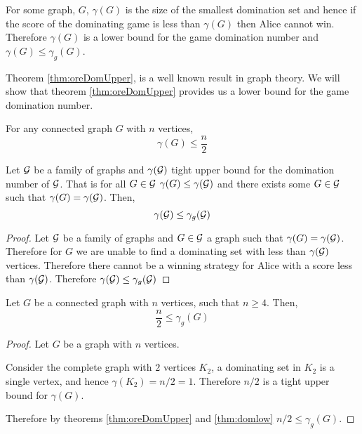 For some graph, $G$, $\gamma(G)$ is the size of the smallest domination set and hence if the score of the dominating game is less than $\gamma(G)$ then Alice cannot win. Therefore $\gamma(G)$ is a lower bound for the game domination number and $\gamma(G)\leq\gamma_g(G)$. 

Theorem \ref{thm:oreDomUpper}, is a well known result in graph theory. We will show that theorem \ref{thm:oreDomUpper} provides us a lower bound for the game domination number.

\begin{theorem} \label{thm:oreDomUpper} 
    For any connected graph $G$ with $n$ vertices,     
    \[\gamma(G) \leq \frac{n}{2}\]
\end{theorem}
\begin{theorem}\label{thm:domlow}
    Let $\mathcal{G}$ be a family of graphs and $\gamma(\mathcal{G})$ tight upper bound for the domination number of $\mathcal{G}$. That is for all $G\in\mathcal{G}$ $\gamma(G)\leq\gamma(\mathcal{G})$ and there exists some $G\in\mathcal{G}$ such that $\gamma(G)=\gamma(\mathcal{G})$. Then,
    \[\gamma(\mathcal{G}) \leq  \gamma_g(\mathcal{G})\]
\end{theorem}

\begin{proof}
    Let $\mathcal{G}$ be a family of graphs and $G\in\mathcal{G}$ a graph such that $\gamma(G) = \gamma(\mathcal{G})$.
    Therefore for $G$ we are unable to find a dominating set with less than $ \gamma(\mathcal{G}) $ vertices.
    Therefore there cannot be a winning strategy for Alice with a score less than $\gamma(\mathcal{G})$.
    Therefore $\gamma(\mathcal{G}) \leq \gamma_g(\mathcal{G})$
\end{proof}


\begin{corollary} \label{thm:gamedomLow}
    Let $G$ be a connected graph with $n$ vertices, such that $n \geq 4$. Then,    
    \[  \frac{n}{2} \leq \gamma_g(G)  \]    
\end{corollary}

\begin{proof}
    Let $G$ be a graph with $n$ vertices.
    
    Consider the complete graph with $2$ vertices $K_2$, a dominating set in $K_2$ is a single vertex, and hence $\gamma(K_2)=n/2=1$. Therefore $n/2$ is a tight upper bound for $\gamma(G)$. 
    
    Therefore by theorems \ref{thm:oreDomUpper} and \ref{thm:domlow} $ n/2 \leq \gamma_g(G)$.
\end{proof}

